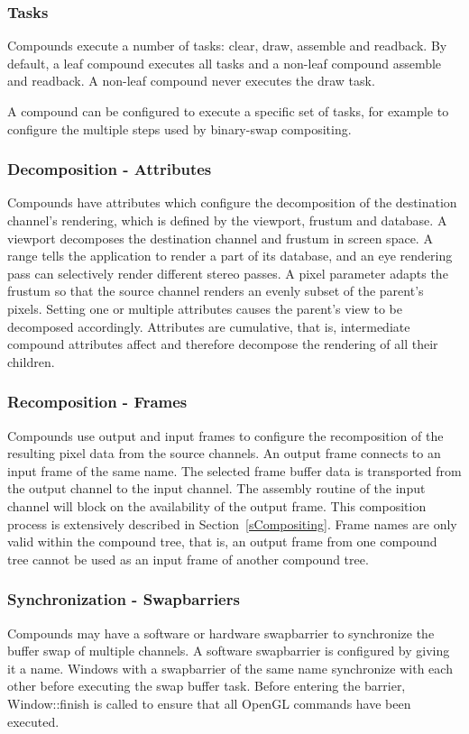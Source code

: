 \documentclass[10pt,a4]{scrartcl}
\newcommand{\sref}[1]{Section~\ref{#1}}
\begin{document}
\subsubsection{Tasks}
Compounds execute a number of tasks: clear, draw, assemble and
readback. By default, a leaf compound executes all tasks and a non-leaf
compound assemble and readback. A non-leaf compound never executes the
draw task.

A compound can be configured to execute a specific set of tasks, for
example to configure the multiple steps used by binary-swap compositing.

\subsubsection{Decomposition - Attributes}
Compounds have attributes which configure the decomposition of the
destination channel's rendering, which is defined by the viewport,
frustum and database. A \textsf{viewport} decomposes the destination
channel and frustum in screen space. A \textsf{range} tells the
application to render a part of its database, and an \textsf{eye}
rendering pass can selectively render different stereo passes. A
\textsf{pixel} parameter adapts the frustum so that the source channel
renders an evenly subset of the parent's pixels. Setting one or multiple
attributes causes the parent's view to be decomposed
accordingly. Attributes are cumulative, that is, intermediate compound
attributes affect and therefore decompose the rendering of all their
children.

\subsubsection{Recomposition - Frames}
Compounds use output and input frames to configure the recomposition of
the resulting pixel data from the source channels. An output frame
connects to an input frame of the same name. The selected frame buffer
data is transported from the output channel to the input channel. The
assembly routine of the input channel will block on the availability of
the output frame. This composition process is extensively described in
\sref{sCompositing}. Frame names are only valid within the compound
tree, that is, an output frame from one compound tree cannot be used as
an input frame of another compound tree.

\subsubsection{\label{sSwapBarrier}Synchronization - Swapbarriers}
Compounds may have a software or hardware swapbarrier to synchronize the
buffer swap of multiple channels. A software swapbarrier is configured
by giving it a name. Windows with a swapbarrier of the same name
synchronize with each other before executing the swap buffer
task. Before entering the barrier, \textsf{Window::finish} is called to
ensure that all OpenGL commands have been executed.
\end{document}
